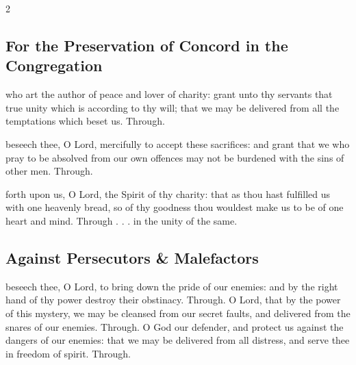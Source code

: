 \begin{multicols}{2}
   \newcolumn

\subsection{For the Preservation of Concord in the Congregation}

\vspace{-0.25\baselineskip}

\collect

\vspace{-0.1\baselineskip}

 who art the author of peace and lover of charity: grant unto thy servants that true unity which is according to thy will; that we may be delivered from all the temptations which beset us. Through.

\vspace{-0.25\baselineskip}

\secret

\vspace{-0.1\baselineskip}

 beseech thee, O Lord, mercifully to accept these sacrifices: and grant that we who pray to be absolved from our own offences may not be burdened with the sins of other men. Through.

\vspace{-0.25\baselineskip}

\postcommunion

\vspace{-0.1\baselineskip}

 forth upon us, O Lord, the Spirit of thy charity: that as thou hast fulfilled us with one heavenly bread, so of thy goodness thou wouldest make us to be of one heart and mind. Through . . . in the unity of the same.


\subsection{Against Persecutors \& Malefactors}
\collect
{} beseech thee, O Lord, to bring down the pride of our enemies: and by the right hand of thy power destroy their obstinacy. Through.
\secret
{} O Lord, that by the power of this mystery, we may be cleansed from our secret faults, and delivered from the snares of our enemies. Through.
\postcommunion
{} O God our defender, and protect us against the dangers of our enemies: that we may be delivered from all distress, and serve thee in freedom of spirit. Through.


\end{multicols}
